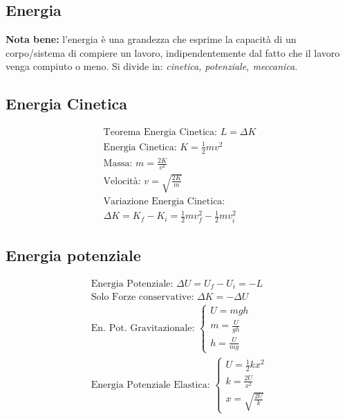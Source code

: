 \subsection{Energia}
\textbf{Nota bene: } l'energia è una grandezza che esprime la capacità di un corpo/sistema di compiere un lavoro, indipendentemente dal fatto che il lavoro venga compiuto o meno. Si divide in: \textit{cinetica, potenziale, meccanica}.

\subsection{Energia Cinetica}

\begin{gather*}
    \text{Teorema Energia Cinetica: } L = \Delta K \\
    \text{Energia Cinetica: } K = \frac{1}{2} m v^2 \\
    \text{Massa: } m = \frac{2K}{v^2} \\
    \text{Velocità: } v = \sqrt{\frac{2K}{m}} \\
    \text{Variazione Energia Cinetica: } \\ \Delta K = K_f - K_i = \frac{1}{2} m v_f^2 - \frac{1}{2} m v_i^2
\end{gather*}

\subsection{Energia potenziale}

\begin{gather*}
    \text{Energia Potenziale: } \Delta U = U_f - U_i = -L \\
    \text{Solo Forze conservative: } \Delta K = - \Delta U \\ 
    \text{En. Pot. Gravitazionale: } \begin{cases}
        U = m g h \\
        m = \frac{U}{gh} \\
        h = \frac{U}{mg}
    \end{cases} \\
    \text{Energia Potenziale Elastica: } \begin{cases}
        U = \frac{1}{2} k x^2 \\
        k = \frac{2U}{x^2} \\
        x = \sqrt{\frac{2U}{k}}
    \end{cases}
\end{gather*}

